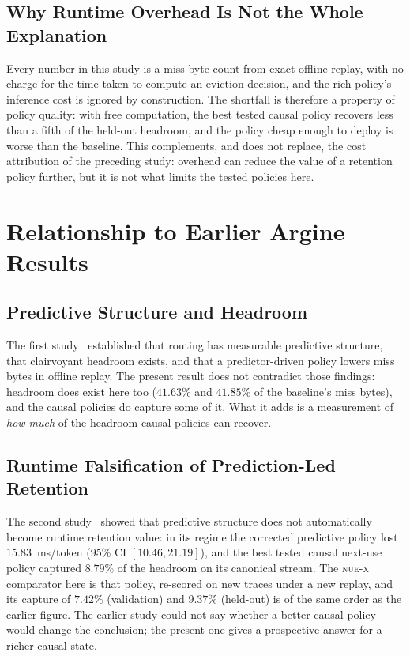 \documentclass[11pt]{article}
\theoremstyle{plain}
\theoremstyle{definition}
\newcommand{\nuex}{\textsc{nue-x}}
\begin{document}
\subsection{Why Runtime Overhead Is Not the Whole Explanation}
\label{sec:overhead}
Every number in this study is a miss-byte count from exact offline replay, with no charge for the time taken to compute an eviction decision, and the rich policy's inference cost is ignored by construction. The shortfall is therefore a property of policy quality: with free computation, the best tested causal policy recovers less than a fifth of the held-out headroom, and the policy cheap enough to deploy is worse than the baseline. This complements, and does not replace, the cost attribution of the preceding study: overhead can reduce the value of a retention policy further, but it is not what limits the tested policies here.

\section{Relationship to Earlier Argine Results}
\label{sec:related}

\subsection{Predictive Structure and Headroom}
The first study~\cite{argine2paper} established that routing has measurable predictive structure, that clairvoyant headroom exists, and that a predictor-driven policy lowers miss bytes in offline replay. The present result does not contradict those findings: headroom does exist here too ($41.63\%$ and $41.85\%$ of the baseline's miss bytes), and the causal policies do capture some of it. What it adds is a measurement of \emph{how much} of the headroom causal policies can recover.

\subsection{Runtime Falsification of Prediction-Led Retention}
The second study~\cite{argine3paper} showed that predictive structure does not automatically become runtime retention value: in its regime the corrected predictive policy lost $15.83$~ms/token (95\% CI $[10.46, 21.19]$), and the best tested causal next-use policy captured $8.79\%$ of the headroom on its canonical stream. The \nuex{} comparator here is that policy, re-scored on new traces under a new replay, and its capture of $7.42\%$ (validation) and $9.37\%$ (held-out) is of the same order as the earlier figure. The earlier study could not say whether a better causal policy would change the conclusion; the present one gives a prospective answer for a richer causal state.
\end{document}
